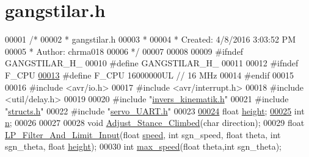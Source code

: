 \hypertarget{gangstilar_8h_source}{}\section{gangstilar.\+h}
\label{gangstilar_8h_source}

\begin{DoxyCode}
00001 \textcolor{comment}{/*}
00002 \textcolor{comment}{ * gangstilar.h}
00003 \textcolor{comment}{ *}
00004 \textcolor{comment}{ * Created: 4/8/2016 3:03:52 PM}
00005 \textcolor{comment}{ *  Author: chrma018}
00006 \textcolor{comment}{ */} 
00007 
00008 
00009 \textcolor{preprocessor}{#ifndef GANGSTILAR\_H\_}
00010 \textcolor{preprocessor}{#define GANGSTILAR\_H\_}
00011 
00012 \textcolor{preprocessor}{#ifndef F\_CPU}
\hypertarget{gangstilar_8h_source.tex_l00013}{}\hyperlink{gangstilar_8h_a43bafb28b29491ec7f871319b5a3b2f8}{00013} \textcolor{preprocessor}{#define F\_CPU 16000000UL        // 16 MHz}
00014 \textcolor{preprocessor}{#endif}
00015 
00016 \textcolor{preprocessor}{#include <avr/io.h>}
00017 \textcolor{preprocessor}{#include <avr/interrupt.h>}
00018 \textcolor{preprocessor}{#include <util/delay.h>}
00019 
00020 \textcolor{preprocessor}{#include "\hyperlink{invers__kinematik_8h}{invers\_kinematik.h}"}
00021 \textcolor{preprocessor}{#include "\hyperlink{structs_8h}{structs.h}"}
00022 \textcolor{preprocessor}{#include "\hyperlink{servo___u_a_r_t_8h}{servo\_UART.h}"}
00023 
\hypertarget{gangstilar_8h_source.tex_l00024}{}\hyperlink{gangstilar_8h_a48083b65ac9a863566dc3e3fff09a5b4}{00024} \textcolor{keywordtype}{float} \hyperlink{gangstilar_8h_a48083b65ac9a863566dc3e3fff09a5b4}{height};
\hypertarget{gangstilar_8h_source.tex_l00025}{}\hyperlink{gangstilar_8h_a76f11d9a0a47b94f72c2d0e77fb32240}{00025} \textcolor{keywordtype}{int} \hyperlink{gangstilar_8h_a76f11d9a0a47b94f72c2d0e77fb32240}{n};
00026 
00027 
00028 \textcolor{keywordtype}{void} \hyperlink{gangstilar_8h_a1cdd1ec49baae5876bf4185c0696ee45}{Adjust\_Stance\_Climbed}(\textcolor{keywordtype}{char} direction);
00029 \textcolor{keywordtype}{float} \hyperlink{gangstilar_8h_a7686716eb9ff55e001f00b15a53f83f0}{LP\_Filter\_And\_Limit\_Input}(\textcolor{keywordtype}{float} \hyperlink{styr_2styr_2main_8c_a7f7e4724cf57d59513b39c5ecc81adc8}{speed}, \textcolor{keywordtype}{int} sgn\_speed, \textcolor{keywordtype}{float} theta, \textcolor{keywordtype}{int} 
      sgn\_theta, \textcolor{keywordtype}{float} \hyperlink{gangstilar_8h_a48083b65ac9a863566dc3e3fff09a5b4}{height});
00030 \textcolor{keywordtype}{int} \hyperlink{gangstilar_8h_a7e22034136fbee493cd09711e57eff2d}{max\_speed}(\textcolor{keywordtype}{float} theta,\textcolor{keywordtype}{int} sgn\_theta);

\end{DoxyCode}
